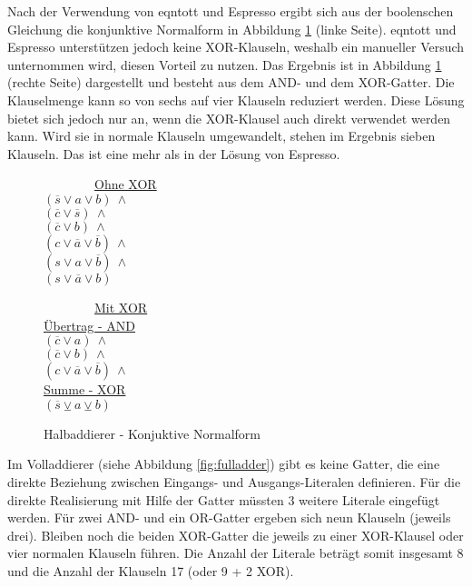 Nach der Verwendung von eqntott und Espresso ergibt sich aus der boolenschen Gleichung die konjunktive Normalform in Abbildung \ref{fig:halfadder_cnf} (linke Seite).
eqntott und Espresso unterstützen jedoch keine XOR-Klauseln, weshalb ein manueller Versuch unternommen wird, diesen Vorteil zu nutzen. Das Ergebnis ist in Abbildung
\ref{fig:halfadder_cnf} (rechte Seite) dargestellt und besteht aus dem AND- und dem XOR-Gatter. Die Klauselmenge kann so von sechs auf vier Klauseln reduziert werden.
Diese Lösung bietet sich jedoch nur an, wenn die XOR-Klausel auch direkt verwendet werden kann. Wird sie in normale Klauseln umgewandelt, stehen im Ergebnis sieben
Klauseln. Das ist eine mehr als in der Lösung von Espresso.
\begin{figure}[!h]
  \centering
  \begin{minipage}[l]{5cm}
    ~~~~~~~~\underline{Ohne XOR}\\
    $ (\overline{s} \vee a \vee b) ~ \wedge $\\
    $ (\overline{c} \vee \overline{s}) ~ \wedge $\\
    $ (\overline{c} \vee b) ~ \wedge $\\
    $ (c \vee \overline{a} \vee \overline{b}) ~ \wedge $\\
    $ (s \vee a \vee \overline{b}) ~ \wedge $\\
    $ (s \vee \overline{a} \vee b) $
  \end{minipage}
  \begin{minipage}[l]{5cm}
    ~~~~~~~~\underline{Mit XOR}\\
    \underline{Übertrag - AND}\\
    $ (\overline{c} \vee a) ~ \wedge $\\
    $ (\overline{c} \vee b) ~ \wedge $\\
    $ (c \vee \overline{a} \vee \overline{b}) ~ \wedge $\\
    \underline{Summe - XOR}\\
    $ (\overline{s} \veebar a \veebar b) $
  \end{minipage}
  \caption{Halbaddierer - Konjuktive Normalform}
  \label{fig:halfadder_cnf}
\end{figure}

Im Volladdierer (siehe Abbildung \ref{fig:fulladder}) gibt es keine Gatter, die eine direkte Beziehung zwischen Eingangs- und Ausgangs-Literalen definieren.
Für die direkte Realisierung mit Hilfe der Gatter müssten 3 weitere Literale eingefügt werden. Für zwei AND- und ein OR-Gatter ergeben sich neun Klauseln (jeweils drei).
Bleiben noch die beiden XOR-Gatter die jeweils zu einer XOR-Klausel oder vier normalen Klauseln führen. Die Anzahl der Literale beträgt somit insgesamt 8 und die Anzahl der
Klauseln 17 (oder 9 + 2 XOR).

